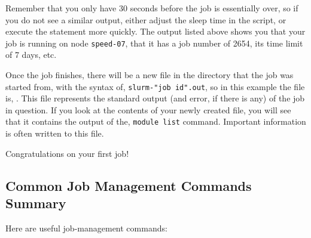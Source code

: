 Remember that you only have 30 seconds before the job is essentially over, so 
if you do not see a similar output, either adjust the sleep time in the 
script, or execute the  statement more quickly. The  
output listed above shows you that your job is 
running on node \texttt{speed-07}, that it has a job number of 2654,
its time limit of 7 days, etc.

Once the job finishes, there will be a new file in the directory that the job 
was started from, with the syntax of, \texttt{slurm-"job id".out}, so 
in this example the file is, . This file represents the 
standard output (and error, if there is any) of the job in question. If you 
look at the contents of your newly created file, you will see that it 
contains the output of the, \texttt{module list} command. 
Important information is often written to this file.

Congratulations on your first job! 

\subsection{Common Job Management Commands Summary}
\label{sect:job-management-commands}

Here are useful job-management commands: 

